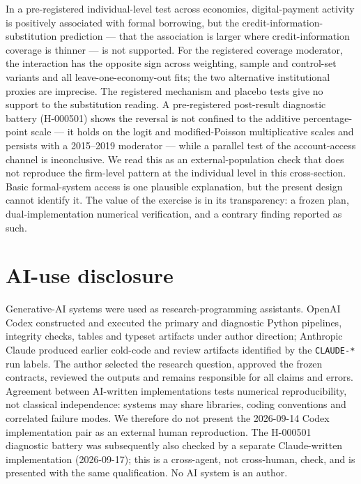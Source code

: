 In a pre-registered individual-level test across \NEconomies{} economies, digital-payment
activity is positively associated with formal borrowing, but the
credit-information-substitution prediction --- that the association is larger where
credit-information coverage is thinner --- is not supported. For the registered coverage
moderator, the interaction has the opposite sign across weighting, sample and control-set
variants and all leave-one-economy-out fits; the two alternative institutional proxies are
imprecise. The registered mechanism and placebo tests give no support to the substitution
reading. A pre-registered post-result diagnostic battery (H-000501) shows the reversal is not
confined to the additive percentage-point scale --- it holds on the logit and modified-Poisson
multiplicative scales and persists with a 2015--2019 moderator --- while a parallel test of
the account-access channel is inconclusive. We read this as an external-population check that
does not reproduce the firm-level pattern at the individual level in this cross-section. Basic
formal-system access is one plausible explanation, but the present design cannot identify it.
The value of the exercise is in its transparency: a frozen plan, dual-implementation numerical
verification, and a contrary finding reported as such.

\section*{AI-use disclosure}

Generative-AI systems were used as research-programming assistants. OpenAI Codex constructed
and executed the primary and diagnostic Python pipelines, integrity checks, tables and typeset
artifacts under author direction; Anthropic Claude produced earlier cold-code and review
artifacts identified by the \texttt{CLAUDE-*} run labels. The author selected the research
question, approved the frozen contracts, reviewed the outputs and remains responsible for all
claims and errors. Agreement between AI-written implementations tests numerical reproducibility,
not classical independence: systems may share libraries, coding conventions and correlated
failure modes. We therefore do not present the 2026-09-14 Codex implementation pair as an
external human reproduction. The H-000501 diagnostic battery was subsequently also checked by
a separate Claude-written implementation (2026-09-17); this is a cross-agent, not
cross-human, check, and is presented with the same qualification. No AI system is an author.

